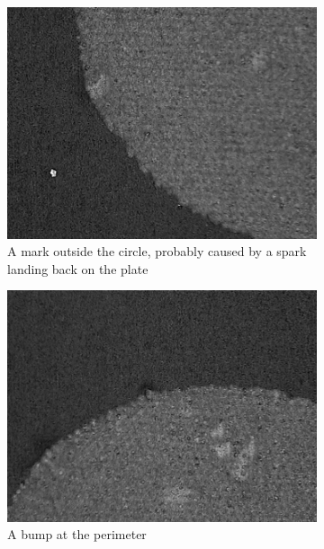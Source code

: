 \begin{figure}[ht]
    \centering
    \begin{subfigure}{0.32\textwidth}
        \centering
        \includegraphics[width=\linewidth]{Pictures/spark-mark.jpeg}
        \caption{A mark outside the circle, probably caused by a spark landing back on the plate}
        \label{fig:spark-mark}
    \end{subfigure}
    \begin{subfigure}{0.32\textwidth}
        \centering
        \includegraphics[width=\linewidth]{Pictures/bump.jpeg}
        \caption{A bump at the perimeter}
        \label{fig:bump}
    \end{subfigure}
    \begin{subfigure}{0.32\textwidth}

\end{subfigure}
\end{figure}
